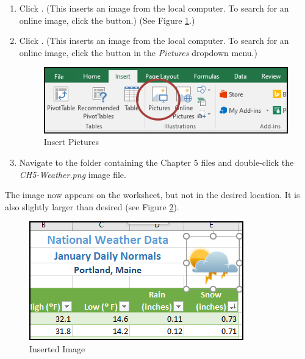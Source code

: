 \begin{enumbox}
	\begin{enumerate}
		\item {} Click . (This inserts an image from the local computer. To search for an online image, click the  button.) (See Figure \ref{05:fig28}.)
		\item {} Click . (This inserts an image from the local computer. To search for an online image, click the  button in the \textit{Pictures} dropdown menu.)

		\begin{figure}[H]
			\centering
			\includegraphics[width=\maxwidth{.95\linewidth}]{gfx/ch05_fig28}
			\caption{Insert Pictures}
			\label{05:fig28}
		\end{figure}

		\item Navigate to the folder containing the Chapter $ 5 $ files and double-click the \textit{CH5-Weather.png} image file.
	\end{enumerate}
\end{enumbox}

The image now appears on the worksheet, but not in the desired location. It is also slightly larger than desired (see Figure \ref{05:fig29}).

\begin{figure}[H]
	\centering
	\includegraphics[width=\maxwidth{.95\linewidth}]{gfx/ch05_fig29}
	\caption{Inserted Image}
	\label{05:fig29}
\end{figure}


